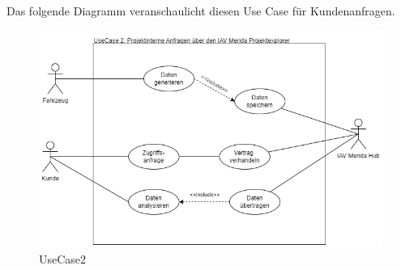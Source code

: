 \newline
Das folgende Diagramm veranschaulicht diesen Use Case für Kundenanfragen.
\begin{figure}[H]
    \centering
    \includegraphics[scale=.6]{media/UseCase2}
    \caption{UseCase2}
    \label{fig:UseCase2}
\end{figure}
\newpage
